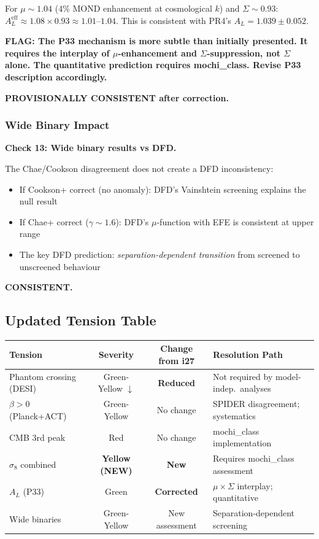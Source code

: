 \documentclass[11pt,a4paper]{article}
\begin{document}
For $\mu \sim 1.04$ (4\% MOND enhancement at cosmological $k$) and $\Sigma \sim 0.93$: $A_L^\mathrm{eff} \approx 1.08 \times 0.93 \approx 1.01$--$1.04$. This is consistent with PR4's $A_L = 1.039 \pm 0.052$.

\textbf{FLAG: The P33 mechanism is more subtle than initially presented. It requires the interplay of $\mu$-enhancement and $\Sigma$-suppression, not $\Sigma$ alone. The quantitative prediction requires mochi\_class. Revise P33 description accordingly.}

\textbf{PROVISIONALLY CONSISTENT after correction.}

\subsubsection{Wide Binary Impact}

\textbf{Check 13: Wide binary results vs DFD.}

The Chae/Cookson disagreement does not create a DFD inconsistency:
\begin{itemize}
\item If Cookson+ correct (no anomaly): DFD's Vainshtein screening explains the null result
\item If Chae+ correct ($\gamma \sim 1.6$): DFD's $\mu$-function with EFE is consistent at upper range
\item The key DFD prediction: \emph{separation-dependent transition} from screened to unscreened behaviour
\end{itemize}
\textbf{CONSISTENT.}

\subsection{Updated Tension Table}

\begin{center}
\begin{tabular}{lccl}
\toprule
\textbf{Tension} & \textbf{Severity} & \textbf{Change from i27} & \textbf{Resolution Path} \\
\midrule
Phantom crossing (DESI) & Green-Yellow $\downarrow$ & \textbf{Reduced} & Not required by model-indep.\ analyses \\
$\beta > 0$ (Planck+ACT) & Green-Yellow & No change & SPIDER disagreement; systematics \\
CMB 3rd peak & Red & No change & mochi\_class implementation \\
$\sigma_8$ combined & \textbf{Yellow (NEW)} & \textbf{New} & Requires mochi\_class assessment \\
$A_L$ (P33) & Green & \textbf{Corrected} & $\mu \times \Sigma$ interplay; quantitative \\
Wide binaries & Green-Yellow & New assessment & Separation-dependent screening \\
\bottomrule
\end{tabular}
\end{center}
\end{document}
